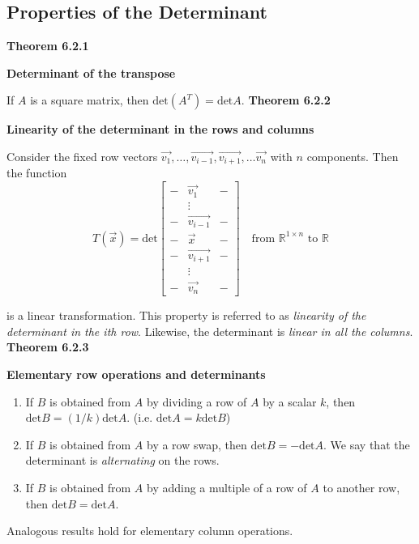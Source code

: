 \subsection{Properties of the Determinant}
\textbf{Theorem 6.2.1}\\
\par\noindent\textbf{Determinant of the transpose}
\par\noindent If $A$ is a square matrix, then $\displaystyle \textrm{det}(A^{T})=\textrm{det}A$.
\textbf{Theorem 6.2.2}\\
\par\noindent\textbf{Linearity of the determinant in the rows and columns}
\par\noindent Consider the fixed row vectors $\vec{v_{1}},\ldots{},\vec{v_{i-1}},\vec{v_{i+1}},\ldots{}\vec{v_{n}}$ with $n$ components. Then the function
\[T(\vec{x})=\textrm{det}\left[\begin{array}{ccc}-&\vec{v_{1}}&-\\{} &\vdots{}&\\{} -&\vec{v_{i-1}}&-\\{} -&\vec{x}&-\\{} -&\vec{v_{i+1}}&-\\{} &\vdots{}&\\{} -&\vec{v_{n}}&- \end{array}\right]\quad{}\textrm{from }\mathbb{R}^{1\times{}n}\textrm{ to }\mathbb{R}\]
\par\noindent is a linear transformation. This property is referred to as \textit{linearity of the determinant in the i\textnormal{th} row}. Likewise, the determinant is \textit{linear in all the columns}.
\textbf{Theorem 6.2.3}\\
\par\noindent\textbf{Elementary row operations and determinants}
\renewcommand{\labelenumi}{\textbf{\alph{enumi}.}}
\begin{enumerate}
\item If $B$ is obtained from $A$ by dividing a row of $A$ by a scalar $k$, then $\textrm{det}B=(1/k)\textrm{det}A$. (i.e. $\textrm{det}A=k\textrm{det}B$)
\item If $B$ is obtained from $A$ by a row swap, then $\textrm{det}B=-\textrm{det}A$. We say that the determinant is \textit{alternating} on the rows.
\item If $B$ is obtained from $A$ by adding a multiple of a row of $A$ to another row, then $\textrm{det}B=\textrm{det}A$.
\end{enumerate}
\par\noindent Analogous results hold for elementary column operations.
